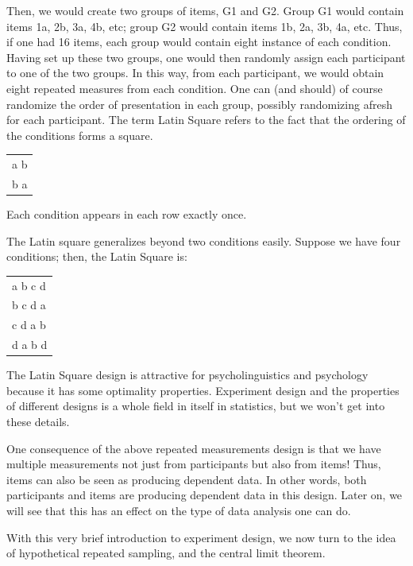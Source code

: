 \documentclass[12pt,]{krantz}
\begin{document}
Then, we would create two groups of items, G1 and G2. Group G1 would contain items 1a, 2b, 3a, 4b, etc; group G2 would contain items 1b, 2a, 3b, 4a, etc. Thus, if one had 16 items, each group would contain eight instance of each condition. Having set up these two groups, one would then randomly assign each participant to one of the two groups. In this way, from each participant, we would obtain eight repeated measures from each condition. One can (and should) of course randomize the order of presentation in each group, possibly randomizing afresh for each participant. The term Latin Square refers to the fact that the ordering of the conditions forms a square.

\begin{longtable}[]{@{}l@{}}
\toprule
\endhead
\textbar{} a \textbar{} b \textbar{}\tabularnewline
\textbar{} b \textbar{} a \textbar{}\tabularnewline
\bottomrule
\end{longtable}

Each condition appears in each row exactly once.

The Latin square generalizes beyond two conditions easily. Suppose we have four conditions; then, the Latin Square is:

\begin{longtable}[]{@{}l@{}}
\toprule
\endhead
\textbar{} a \textbar{} b \textbar{} c \textbar{} d \textbar{}\tabularnewline
\textbar{} b \textbar{} c \textbar{} d \textbar{} a \textbar{}\tabularnewline
\textbar{} c \textbar{} d \textbar{} a \textbar{} b \textbar{}\tabularnewline
\textbar{} d \textbar{} a \textbar{} b \textbar{} d \textbar{}\tabularnewline
\bottomrule
\end{longtable}

The Latin Square design is attractive for psycholinguistics and psychology because it has some optimality properties. Experiment design and the properties of different designs is a whole field in itself in statistics, but we won't get into these details.

One consequence of the above repeated measurements design is that we have multiple measurements not just from participants but also from items! Thus, items can also be seen as producing dependent data. In other words, both participants and items are producing dependent data in this design. Later on, we will see that this has an effect on the type of data analysis one can do.

With this very brief introduction to experiment design, we now turn to the idea of hypothetical repeated sampling, and the central limit theorem.
\end{document}
